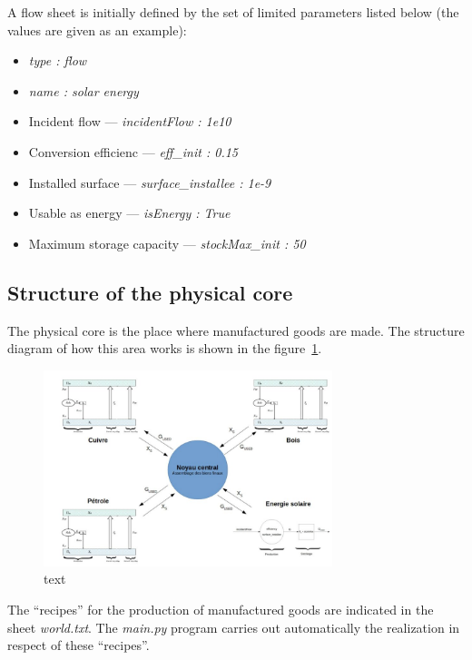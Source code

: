 \documentclass[12pt,a4paper]{article}%
\begin{document}
A flow sheet is initially defined by the set of limited parameters listed below (the values are given as an example):

\begin{itemize}
\item \textit{type : flow}

\item \textit{name : solar energy}

\item Incident flow ---  \textit{incidentFlow : 1e10}

\item Conversion efficienc ---  \textit{eff\_init : 0.15}

\item Installed surface ---  \textit{surface\_installee : 1e-9}

\item Usable as energy ---  \textit{isEnergy : True }

\item Maximum storage capacity ---  \textit{stockMax\_init : 50}
\end{itemize}

\subsection{Structure of the physical core}

The physical core is the place where manufactured goods are made. The structure diagram of how this area works is shown in the figure~\ref{fig:kernel}.

\begin{figure}[h]
	\centering 
	\includegraphics[width=0.75\textwidth]{figures/NoyauCentral.jpg}
	\caption{text}
	\label{fig:kernel}
\end{figure}

The ``recipes'' for the production of manufactured goods are indicated in the sheet \textit{world.txt}. The \textit{main.py} program carries out automatically the realization in respect of these ``recipes''.
\end{document}
